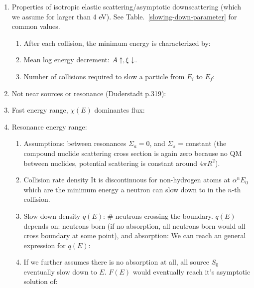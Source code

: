 \documentclass{school-22.211-notes}
\begin{document}
\clearpage
{}
\begin{enumerate}
\item Properties of isotropic elastic scattering/asymptotic downscattering (which we assume for larger than 4 eV). See Table.~\ref{slowing-down-parameter} for common values. 
  \begin{enumerate}
    \item After each collision, the minimum energy is characterized by: 
      
    \item Mean log energy decrement: $A \uparrow, \xi \downarrow$. 

    \item Number of collisions required to slow a particle from $E_i$ to $E_f$:
  \end{enumerate}

\item Not near sources or resonance (Duderstadt p.319): 

\item Fast energy range, $\chi(E)$ dominantes flux:

\item Resonance energy range: 
  \begin{enumerate}
    \item Assumptions: between resonances $\Sigma_a =0$, and $\Sigma_s$ = constant (the compound nuclide scattering cross section is again zero because no QM between nuclides, potential scattering is constant around $4 \pi R^2$). 

    \item Collision rate density 
      It is discontinuous for non-hydrogen atoms at $\alpha^n E_0$ which are the minimum energy a neutron can slow down to in the $n$-th collision. 

    \item Slow down density $q(E)$: \# neutrons crossing the boundary. $q(E)$ depends on: neutrons born (if no absorption, all neutrons born would all cross boundary at some point), and absorption: 
      We can reach an general expression for $q(E)$:

    \item If we further assumes there is no absorption at all, all source $S_0$ eventually slow down to $E$. $F(E)$ would eventually reach it's asymptotic solution of: 
  \end{enumerate}
\end{enumerate}
\end{document}
